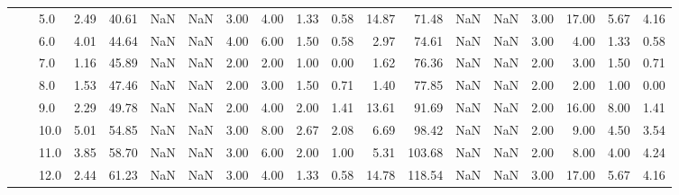 \begin{tabular}{lllrrrrrrrrrrrrrrrr}
       &     & 5.0  &      2.49 &      40.61 &               NaN &                NaN &  3.00 &   4.00 &             1.33 &                         0.58 &     14.87 &      71.48 &               NaN &                NaN & 3.00 &  17.00 &             5.67 &                         4.16 \\
       &     & 6.0  &      4.01 &      44.64 &               NaN &                NaN &  4.00 &   6.00 &             1.50 &                         0.58 &      2.97 &      74.61 &               NaN &                NaN & 3.00 &   4.00 &             1.33 &                         0.58 \\
       &     & 7.0  &      1.16 &      45.89 &               NaN &                NaN &  2.00 &   2.00 &             1.00 &                         0.00 &      1.62 &      76.36 &               NaN &                NaN & 2.00 &   3.00 &             1.50 &                         0.71 \\
       &     & 8.0  &      1.53 &      47.46 &               NaN &                NaN &  2.00 &   3.00 &             1.50 &                         0.71 &      1.40 &      77.85 &               NaN &                NaN & 2.00 &   2.00 &             1.00 &                         0.00 \\
       &     & 9.0  &      2.29 &      49.78 &               NaN &                NaN &  2.00 &   4.00 &             2.00 &                         1.41 &     13.61 &      91.69 &               NaN &                NaN & 2.00 &  16.00 &             8.00 &                         1.41 \\
       &     & 10.0 &      5.01 &      54.85 &               NaN &                NaN &  3.00 &   8.00 &             2.67 &                         2.08 &      6.69 &      98.42 &               NaN &                NaN & 2.00 &   9.00 &             4.50 &                         3.54 \\
       &     & 11.0 &      3.85 &      58.70 &               NaN &                NaN &  3.00 &   6.00 &             2.00 &                         1.00 &      5.31 &     103.68 &               NaN &                NaN & 2.00 &   8.00 &             4.00 &                         4.24 \\
       &     & 12.0 &      2.44 &      61.23 &               NaN &                NaN &  3.00 &   4.00 &             1.33 &                         0.58 &     14.78 &     118.54 &               NaN &                NaN & 3.00 &  17.00 &             5.67 &                         4.16 \\

\end{tabular}

